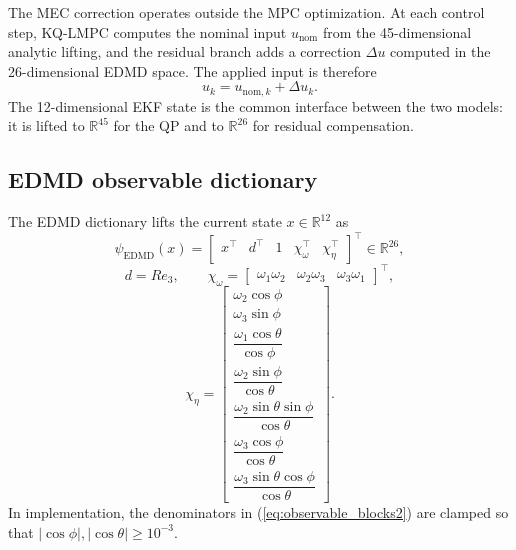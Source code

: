 \documentclass{article}
\begin{document}
The MEC correction operates outside the MPC optimization. At each control step, KQ-LMPC computes the nominal input $u_{\mathrm{nom}}$ from the 45-dimensional analytic lifting, and the residual branch adds a correction $\Delta u$ computed in the 26-dimensional EDMD space. The applied input is therefore
\begin{equation}
u_k = u_{\mathrm{nom},k} + \Delta u_k.
\label{eq:mec_arch}
\end{equation}
The 12-dimensional EKF state is the common interface between the two models: it is lifted to $\mathbb{R}^{45}$ for the QP and to $\mathbb{R}^{26}$ for residual compensation.

\subsection{EDMD observable dictionary}

The EDMD dictionary lifts the current state $x\in\mathbb{R}^{12}$ as
\begin{equation}
\psi_{\mathrm{EDMD}}(x)=
\begin{bmatrix}
x^{\top} & d^{\top} & 1 & \chi_{\omega}^{\top} & \chi_{\eta}^{\top}
\end{bmatrix}^{\top}
\in\mathbb{R}^{26},
\label{eq:observable_correct}
\end{equation}
\begin{equation}
d = Re_3,
\qquad
\chi_{\omega} =
\begin{bmatrix}
\omega_1\omega_2 &
\omega_2\omega_3 &
\omega_3\omega_1
\end{bmatrix}^{\top},
\label{eq:observable_blocks1}
\end{equation}
\begin{equation}
\chi_{\eta} =
\begin{bmatrix}
\omega_{2}\cos\phi \\
\omega_{3}\sin\phi \\
\dfrac{\omega_{1}\cos\theta}{\cos\phi} \\
\dfrac{\omega_{2}\sin\phi}{\cos\theta} \\
\dfrac{\omega_{2}\sin\theta\sin\phi}{\cos\theta} \\
\dfrac{\omega_{3}\cos\phi}{\cos\theta} \\
\dfrac{\omega_{3}\sin\theta\cos\phi}{\cos\theta}
\end{bmatrix}.
\label{eq:observable_blocks2}
\end{equation}
In implementation, the denominators in (\ref{eq:observable_blocks2}) are clamped so that $|\cos\phi|,|\cos\theta|\ge 10^{-3}$.
\end{document}
